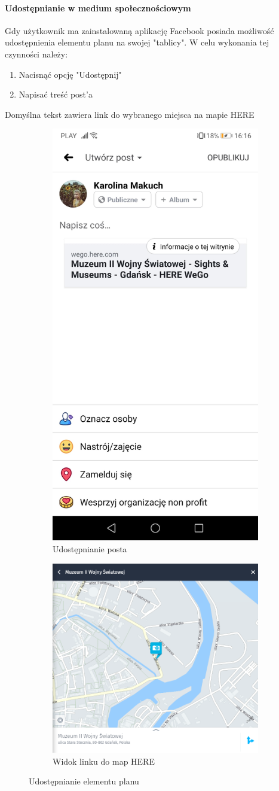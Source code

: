 \documentclass[10pt,twoside,a4paper]{report}
\begin{document}
\paragraph{Udostępnianie w medium społecznościowym}
Gdy użytkownik ma zainstalowaną aplikację Facebook posiada możliwość udostępnienia elementu planu na swojej "tablicy". W celu wykonania tej czynności należy:
\begin{enumerate}
\item Nacisnąć opcję "Udostępnij"
\item Napisać treść post'a
\end{enumerate}
Domyślna tekst zawiera link do wybranego miejsca na mapie HERE

\begin{figure}[h]
\begin{subfigure}{0.3\textwidth}
\centering
\includegraphics[width=0.9\linewidth, width=5cm]{shareOnFacebook}
\caption{Udostępnianie posta}
\label{fig:shareOnFacebook}
\end{subfigure}
\begin{subfigure}{0.7\textwidth}
\centering
\includegraphics[width=0.9\linewidth, width=9cm]{hereMobile}
\caption{Widok linku do map HERE}
\label{fig:hereMobile}
\end{subfigure}
\caption{Udostępnianie elementu planu}
\label{fig:podrecznik8}
\end{figure}
\FloatBarrier
\end{document}
